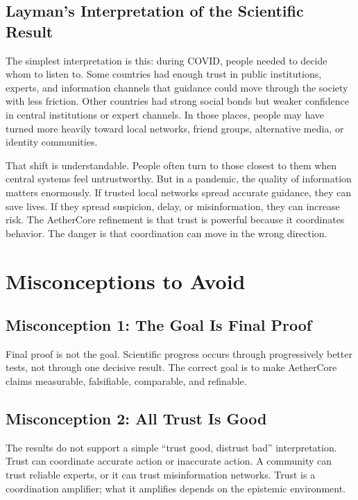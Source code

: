 \documentclass[12pt]{article}
\begin{document}
\subsection{Layman's Interpretation of the Scientific Result}

The simplest interpretation is this: during COVID, people needed to decide whom to listen to. Some countries had enough trust in public institutions, experts, and information channels that guidance could move through the society with less friction. Other countries had strong social bonds but weaker confidence in central institutions or expert channels. In those places, people may have turned more heavily toward local networks, friend groups, alternative media, or identity communities.

That shift is understandable. People often turn to those closest to them when central systems feel untrustworthy. But in a pandemic, the quality of information matters enormously. If trusted local networks spread accurate guidance, they can save lives. If they spread suspicion, delay, or misinformation, they can increase risk. The AetherCore refinement is that trust is powerful because it coordinates behavior. The danger is that coordination can move in the wrong direction.

\section{Misconceptions to Avoid}

\subsection{Misconception 1: The Goal Is Final Proof}

Final proof is not the goal. Scientific progress occurs through progressively better tests, not through one decisive result. The correct goal is to make AetherCore claims measurable, falsifiable, comparable, and refinable.

\subsection{Misconception 2: All Trust Is Good}

The results do not support a simple ``trust good, distrust bad'' interpretation. Trust can coordinate accurate action or inaccurate action. A community can trust reliable experts, or it can trust misinformation networks. Trust is a coordination amplifier; what it amplifies depends on the epistemic environment.
\end{document}
